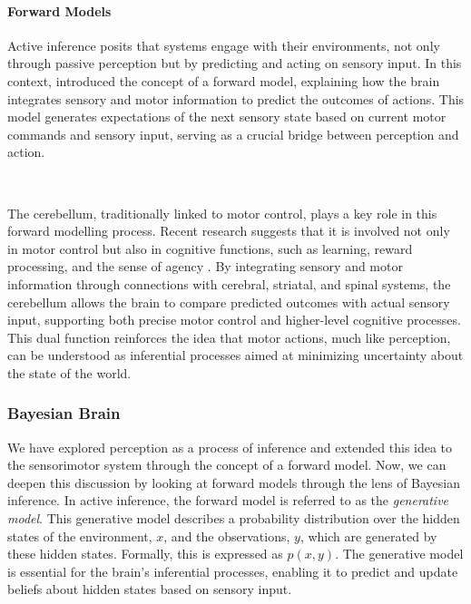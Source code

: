 \documentclass{article}
\begin{document}
\paragraph{Forward Models}

Active inference posits that systems engage with their environments, not only through passive perception but by predicting and acting on sensory input. In this context, \citet{miall1996forward} introduced the concept of a forward model, explaining how the brain integrates sensory and motor information to predict the outcomes of actions. This model generates expectations of the next sensory state based on current motor commands and sensory input, serving as a crucial bridge between perception and action.

\

The cerebellum, traditionally linked to motor control, plays a key role in this forward modelling process. Recent research suggests that it is involved not only in motor control but also in cognitive functions, such as learning, reward processing, and the sense of agency \citep{welniarz2021forward}. By integrating sensory and motor information through connections with cerebral, striatal, and spinal systems, the cerebellum allows the brain to compare predicted outcomes with actual sensory input, supporting both precise motor control and higher-level cognitive processes. This dual function reinforces the idea that motor actions, much like perception, can be understood as inferential processes aimed at minimizing uncertainty about the state of the world.


\subsubsection{Bayesian Brain}

We have explored perception as a process of inference and extended this idea to the sensorimotor system through the concept of a forward model. Now, we can deepen this discussion by looking at forward models through the lens of Bayesian inference. In active inference, the forward model is referred to as the \textit{generative model}. This generative model describes a probability distribution over the hidden states of the environment, $x$, and the observations, $y$, which are generated by these hidden states. Formally, this is expressed as $p(x, y)$. The generative model is essential for the brain’s inferential processes, enabling it to predict and update beliefs about hidden states based on sensory input.
\end{document}
